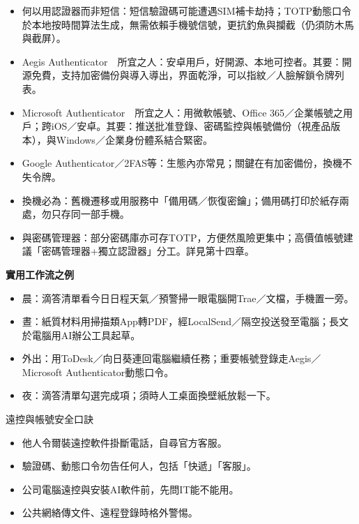 
\begin{itemize}
  \item 何以用認證器而非短信：短信驗證碼可能遭遇SIM補卡劫持；TOTP動態口令於本地按時間算法生成，無需依賴手機號信號，更抗釣魚與攔截（仍須防木馬與截屏）。
  \item Aegis Authenticator　所宜之人：安卓用戶，好開源、本地可控者。其要：開源免費，支持加密備份與導入導出，界面乾淨，可以指紋／人臉解鎖令牌列表。
  \item Microsoft Authenticator　所宜之人：用微軟帳號、Office 365／企業帳號之用戶；跨iOS／安卓。其要：推送批准登錄、密碼監控與帳號備份（視產品版本），與Windows／企業身份體系結合緊密。
  \item Google Authenticator／2FAS等：生態內亦常見；關鍵在有加密備份，換機不失令牌。
  \item 換機必為：舊機遷移或用服務中「備用碼／恢復密鑰」；備用碼打印於紙存兩處，勿只存同一部手機。
  \item 與密碼管理器：部分密碼庫亦可存TOTP，方便然風險更集中；高價值帳號建議「密碼管理器+獨立認證器」分工。詳見第十四章。
\end{itemize}


\textbf{實用工作流之例}\par

\begin{itemize}
  \item 晨：滴答清單看今日日程天氣／預警掃一眼電腦開Trae／文檔，手機置一旁。
  \item 晝：紙質材料用掃描類App轉PDF，經LocalSend／隔空投送發至電腦；長文於電腦用AI辦公工具起草。
  \item 外出：用ToDesk／向日葵連回電腦繼續任務；重要帳號登錄走Aegis／Microsoft Authenticator動態口令。
  \item 夜：滴答清單勾選完成項；須時人工桌面換壁紙放鬆一下。
\end{itemize}

\begin{tcbwarn}{遠控與帳號安全口訣}
\begin{itemize}
  \item 他人令爾裝遠控軟件掛斷電話，自尋官方客服。
  \item 驗證碼、動態口令勿告任何人，包括「快遞」「客服」。
  \item 公司電腦遠控與安裝AI軟件前，先問IT能不能用。
  \item 公共網絡傳文件、遠程登錄時格外警惕。
\end{itemize}

\end{tcbwarn}

